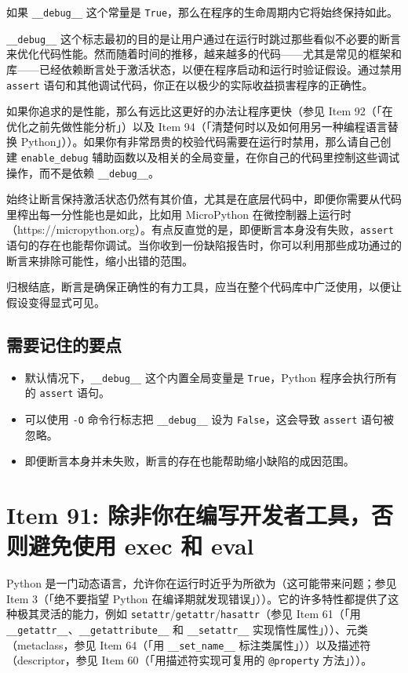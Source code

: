 如果 \texttt{\_\_debug\_\_} 这个常量是 \texttt{True}，那么在程序的生命周期内它将始终保持如此。

\texttt{\_\_debug\_\_} 这个标志最初的目的是让用户通过在运行时跳过那些看似不必要的断言来优化代码性能。然而随着时间的推移，越来越多的代码——尤其是常见的框架和库——已经依赖断言处于激活状态，以便在程序启动和运行时验证假设。通过禁用 \texttt{assert} 语句和其他调试代码，你正在以极少的实际收益损害程序的正确性。

如果你追求的是性能，那么有远比这更好的办法让程序更快（参见 Item 92（「在优化之前先做性能分析」）以及 Item 94（「清楚何时以及如何用另一种编程语言替换 Python」））。如果你有非常昂贵的校验代码需要在运行时禁用，那么请自己创建 \texttt{enable\_debug} 辅助函数以及相关的全局变量，在你自己的代码里控制这些调试操作，而不是依赖 \texttt{\_\_debug\_\_}。

始终让断言保持激活状态仍然有其价值，尤其是在底层代码中，即便你需要从代码里榨出每一分性能也是如此，比如用 MicroPython 在微控制器上运行时（https://micropython.org）。有点反直觉的是，即便断言本身没有失败，\texttt{assert} 语句的存在也能帮你调试。当你收到一份缺陷报告时，你可以利用那些成功通过的断言来排除可能性，缩小出错的范围。

归根结底，断言是确保正确性的有力工具，应当在整个代码库中广泛使用，以便让假设变得显式可见。

\subsection{需要记住的要点}

\begin{itemize}
\item 默认情况下，\texttt{\_\_debug\_\_} 这个内置全局变量是 \texttt{True}，Python 程序会执行所有的 \texttt{assert} 语句。
\item 可以使用 \texttt{-O} 命令行标志把 \texttt{\_\_debug\_\_} 设为 \texttt{False}，这会导致 \texttt{assert} 语句被忽略。
\item 即便断言本身并未失败，断言的存在也能帮助缩小缺陷的成因范围。
\end{itemize}

\section{Item 91: 除非你在编写开发者工具，否则避免使用 exec 和 eval}

Python 是一门动态语言，允许你在运行时近乎为所欲为（这可能带来问题；参见 Item 3（「绝不要指望 Python 在编译期就发现错误」））。它的许多特性都提供了这种极其灵活的能力，例如 \texttt{setattr}/\texttt{getattr}/\texttt{hasattr}（参见 Item 61（「用 \texttt{\_\_getattr\_\_}、\texttt{\_\_getattribute\_\_} 和 \texttt{\_\_setattr\_\_} 实现惰性属性」））、元类（metaclass，参见 Item 64（「用 \texttt{\_\_set\_name\_\_} 标注类属性」））以及描述符（descriptor，参见 Item 60（「用描述符实现可复用的 \texttt{@property} 方法」））。

